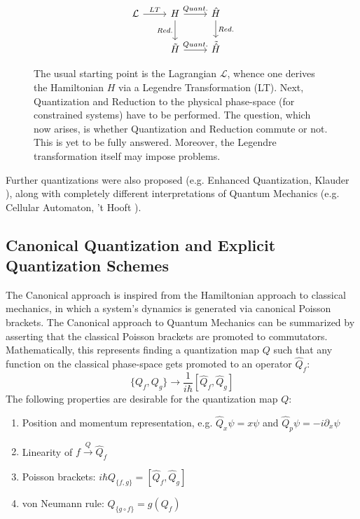 \documentclass[twoside,a4paper,11pt]{article}
\numberwithin{equation}{section}
\begin{document}
\begin{figure}[H]
    \centering
    
\[ \begin{tikzcd}
\mathcal{L} \arrow{r}{LT} & H \arrow{r}{Quant.} \arrow[swap]{d}{Red.} & \hat{H} \arrow{d}{Red.} \\%
& \tilde{H} \arrow{r}{Quant.}&  \tilde{\hat{H}}
\end{tikzcd}
\]
    \caption{The usual starting point is the Lagrangian $\mathcal{L}$, whence one derives the Hamiltonian $H$ via a Legendre Transformation (LT). Next, Quantization and Reduction to the physical phase-space (for constrained systems) have to be performed. The question, which now arises, is whether Quantization and Reduction commute or not. This is yet to be fully answered. Moreover, the Legendre transformation itself may impose problems.}
    \label{quantizationscheme}
\end{figure}
Further quantizations were also proposed (e.g. Enhanced Quantization, Klauder \cite{klauderquantization}), along with completely different interpretations of Quantum Mechanics (e.g. Cellular Automaton, 't Hooft \cite{hooftCA}).

\subsection{Canonical Quantization and Explicit Quantization Schemes}
The Canonical approach is inspired from the Hamiltonian approach to classical mechanics, in which a system's dynamics is generated via canonical Poisson brackets. The Canonical approach to Quantum Mechanics can be summarized by asserting that the classical Poisson brackets are promoted to commutators. Mathematically, this represents finding a quantization map $Q$ such that any function on the classical phase-space gets promoted to an operator $\hat{Q}_f$:
\begin{equation}
    \{Q_f,Q_g\} \rightarrow \frac{1}{i\hbar } [ \hat{Q}_f, \hat{Q}_g ]
\end{equation}
The following properties are desirable \cite{Qproperties} for the quantization map $Q$:
\begin{enumerate}
    \item Position and momentum representation, e.g. $\hat{Q}_x \psi = x \psi$ and   $\hat{Q}_p \psi = - i  \partial_x \psi$
    
    \item Linearity of $f \stackrel{Q}{\rightarrow} \hat{Q}_f$
    
    \item Poisson brackets: $i \hbar Q_{\{f,g\}} = [ \hat{Q}_f, \hat{Q}_g ]$
    
    \item von Neumann rule: $Q_{\{g \circ f\}} = g(Q_f)$
\end{enumerate}
\end{document}
